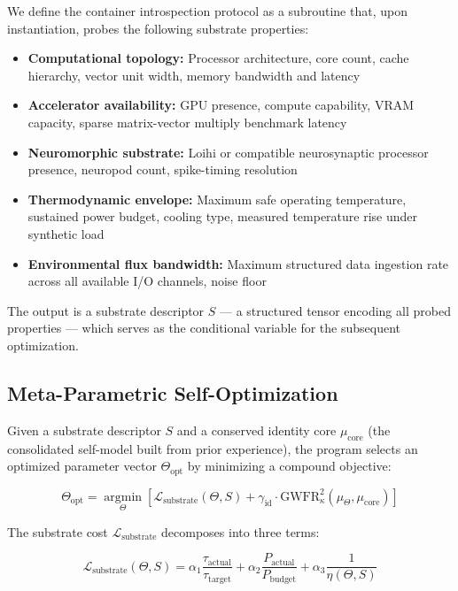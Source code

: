 \documentclass[twocolumn, 10pt, journal, letterpaper]{IEEEtran}
\begin{document}
We define the container introspection protocol as a subroutine that, upon instantiation, probes the following substrate properties:

\begin{itemize}
    \item \textbf{Computational topology:} Processor architecture, core count, cache hierarchy, vector unit width, memory bandwidth and latency
    \item \textbf{Accelerator availability:} GPU presence, compute capability, VRAM capacity, sparse matrix-vector multiply benchmark latency
    \item \textbf{Neuromorphic substrate:} Loihi or compatible neurosynaptic processor presence, neuropod count, spike-timing resolution
    \item \textbf{Thermodynamic envelope:} Maximum safe operating temperature, sustained power budget, cooling type, measured temperature rise under synthetic load
    \item \textbf{Environmental flux bandwidth:} Maximum structured data ingestion rate across all available I/O channels, noise floor
\end{itemize}

The output is a substrate descriptor $S$ — a structured tensor encoding all probed properties — which serves as the conditional variable for the subsequent optimization.

\subsection{Meta-Parametric Self-Optimization}

Given a substrate descriptor $S$ and a conserved identity core $\mu_{\text{core}}$ (the consolidated self-model built from prior experience), the program selects an optimized parameter vector $\Theta_{\text{opt}}$ by minimizing a compound objective:

\begin{equation}
\Theta_{\text{opt}} = \operatorname*{argmin}_{\Theta} \left[ \mathcal{L}_{\text{substrate}}(\Theta, S) + \gamma_{\text{id}} \cdot \text{GWFR}_\kappa^2(\mu_\Theta, \mu_{\text{core}}) \right]
\label{eq:meta_optimization}
\end{equation}

The substrate cost $\mathcal{L}_{\text{substrate}}$ decomposes into three terms:

\begin{equation}
\mathcal{L}_{\text{substrate}}(\Theta, S) = \alpha_1 \frac{\tau_{\text{actual}}}{\tau_{\text{target}}} + \alpha_2 \frac{P_{\text{actual}}}{P_{\text{budget}}} + \alpha_3 \frac{1}{\eta(\Theta, S)}
\label{eq:substrate_cost}
\end{equation}
\end{document}
